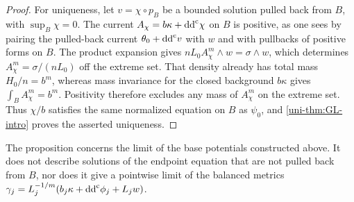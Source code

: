 \begin{proof}
For uniqueness, let $v=\chi\circ p_B$ be a bounded solution pulled back from $B$, with $\sup_B\chi=0$. The current $A_\chi=b\kappa+\mathrm{dd}^{\mathrm{c}}\chi$ on $B$ is positive, as one sees by pairing the pulled-back current $\theta_0+\mathrm{dd}^{\mathrm{c}} v$ with $w$ and with pullbacks of positive forms on $B$. The product expansion gives $nL_0A_\chi^m\wedge w=\sigma\wedge w$, which determines $A_\chi^m=\sigma/(nL_0)$ off the extreme set. That density already has total mass $H_0/n=b^m$, whereas mass invariance for the closed background $b\kappa$ gives $\int_BA_\chi^m=b^m$. Positivity therefore excludes any mass of $A_\chi^m$ on the extreme set. Thus $\chi/b$ satisfies the same normalized equation on $B$ as $\psi_0$, and \cref{uni-thm:GL-intro} proves the asserted uniqueness.
\end{proof}

The proposition concerns the limit of the base potentials constructed above. It does not describe solutions of the endpoint equation that are not pulled back from $B$, nor does it give a pointwise limit of the balanced metrics $\gamma_j=L_j^{-1/m}(b_j\kappa+\mathrm{dd}^{\mathrm{c}}\phi_j+L_jw)$.
